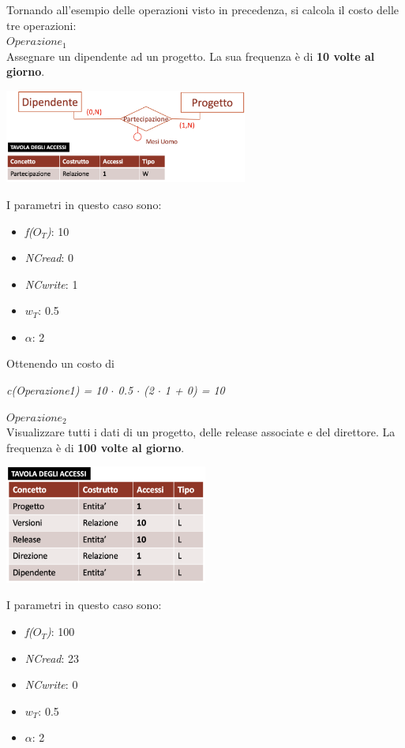 \documentclass{article}
\begin{document}
Tornando all'esempio delle operazioni visto in precedenza, si calcola il costo delle tre operazioni:\vspace*{14pt}\\
\textit{$Operazione_1$}\\
Assegnare un dipendente ad un progetto. La sua frequenza è di \textbf{10 volte al giorno}.
\begin{center}
    \includegraphics[width=0.6\textwidth]{foto 12.png}\vspace*{50pt}\\
\end{center}
I parametri in questo caso sono:
\begin{itemize}[label={ }, leftmargin=1cm]
    \item \textit{f($O_T$)}: 10
    \item \textit{NCread}: 0
    \item \textit{NCwrite}: 1
    \item \textit{$w_T$}: 0.5
    \item \textit{$\alpha$}: 2
\end{itemize}
Ottenendo un costo di
\begin{center}
    \textit{c(Operazione1) = 10 $\cdot$ 0.5 $\cdot$ (2 $\cdot$ 1 + 0) = 10}\vspace{14pt}\\
\end{center}
\textit{$Operazione_2$}\\
Visualizzare tutti i dati di un progetto, delle release associate e del direttore. La frequenza è di \textbf{100 volte al giorno}.
\begin{center}
    \includegraphics[width=0.5\textwidth]{foto 13.png}
\end{center}
I parametri in questo caso sono:
\begin{itemize}[label={ }, leftmargin=1cm]
    \item \textit{f($O_T$)}: 100
    \item \textit{NCread}: 23
    \item \textit{NCwrite}: 0
    \item \textit{$w_T$}: 0.5
    \item \textit{$\alpha$}: 2
\end{itemize}
\end{document}
